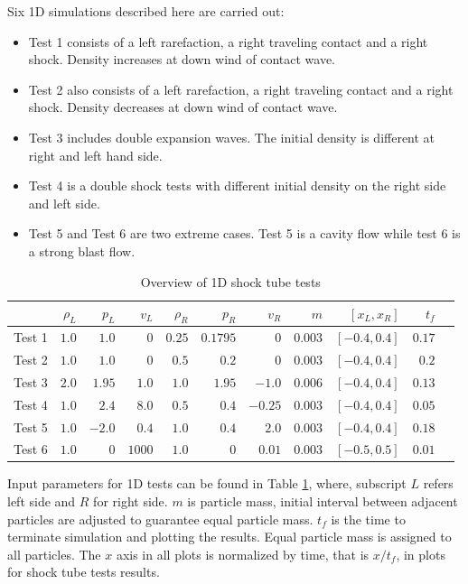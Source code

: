 Six 1D simulations described here are carried out:
\begin{itemize}%
\item Test 1 consists of a left rarefaction, a right traveling contact and a right shock. Density increases at down wind of contact wave. 
\item Test 2 also consists of a left rarefaction, a right traveling contact and a right shock. Density decreases at down wind of contact wave. 
\item Test 3 includes double expansion waves. The initial density is different at right and left hand side. 
\item Test 4 is a double shock tests with different initial density on the right side and left side.
\item Test 5 and Test 6 are two extreme cases. Test 5 is a cavity flow while test 6 is a strong blast flow.
\end{itemize}

\begin{table}
\centering
      \caption{Overview of 1D shock tube tests}		
	  \begin{tabular}{lrrrrrrrrrr}
	    \hline
	          & $\rho_L$ & $p_L$ &$v_L$ & $\rho_R$ & $p_R$ &$v_R$ & $m$ & $[x_L, x_R]$ & $t_f$\\
	    \hline
	    Test 1 & $1.0$ & $1.0$ &$0$ & $0.25$ & $0.1795$ &$0$ & $0.003$  & $[-0.4, 0.4]$ & $0.17$\\
	    	Test 2 & $1.0$ & $1.0$ &$0$ & $0.5$ & $0.2$ &$0$ & $0.003$  & $[-0.4, 0.4]$ & $0.2$\\
	    	Test 3 & $2.0$ & $1.95$ &$1.0$ & $1.0$ & $1.95$ &$-1.0$  & $0.006$  & $[-0.4, 0.4]$ & $0.13$\\
	    Test 4 & $1.0$ & $2.4$ &$8.0$ & $0.5$ & $0.4$ &$-0.25$ & $0.003$  & $[-0.4, 0.4]$ & $0.05$\\
	    	Test 5 & $1.0$ & $-2.0$ &$0.4$ & $1.0$ & $0.4$ &$2.0$ & $0.003$  & $[-0.4, 0.4]$ & $0.18$\\
	    	Test 6 & $1.0$ & $0$ &$1000$ & $1.0$ & $0$ &$0.01$ & $0.003$  & $[-0.5, 0.5]$  & $0.01$\\
	    \hline
	  \end{tabular}
	  \label{tab:1D-shock-input_parameters}
\end{table}
Input parameters for 1D tests can be found in Table \ref{tab:1D-shock-input_parameters}, where, subscript $L$ refers left side and $R$ for right side. $m$ is particle mass, initial interval between adjacent particles are adjusted to guarantee equal particle mass. $t_f$ is the time to terminate simulation and plotting the results. Equal particle mass is assigned to all particles. The $x$ axis in all plots is normalized by time, that is $x/t_f$, in plots for shock tube tests results.
